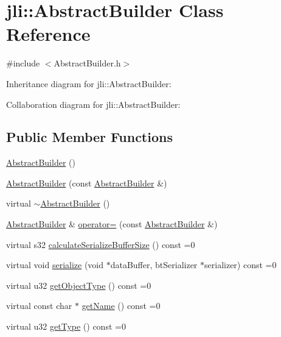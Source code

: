 \hypertarget{classjli_1_1_abstract_builder}{\section{jli\+:\+:Abstract\+Builder Class Reference}
\label{classjli_1_1_abstract_builder}
}


{\ttfamily \#include $<$Abstract\+Builder.\+h$>$}



Inheritance diagram for jli\+:\+:Abstract\+Builder\+:


Collaboration diagram for jli\+:\+:Abstract\+Builder\+:
\subsection*{Public Member Functions}
\begin{DoxyCompactItemize}
\item 
\hyperlink{classjli_1_1_abstract_builder_a25c37208a1124c8d16688ed9627b91ac}{Abstract\+Builder} ()
\item 
\hyperlink{classjli_1_1_abstract_builder_afa72506ca991fd169f99aca02cf0a56e}{Abstract\+Builder} (const \hyperlink{classjli_1_1_abstract_builder}{Abstract\+Builder} \&)
\item 
virtual \hyperlink{classjli_1_1_abstract_builder_ac685e3eedc598acfa1f8f879e8bd8767}{$\sim$\+Abstract\+Builder} ()
\item 
\hyperlink{classjli_1_1_abstract_builder}{Abstract\+Builder} \& \hyperlink{classjli_1_1_abstract_builder_af22cd8c52e03a1ce5adad70b6b9c06cf}{operator=} (const \hyperlink{classjli_1_1_abstract_builder}{Abstract\+Builder} \&)
\item 
virtual s32 \hyperlink{classjli_1_1_abstract_builder_a107ab66007cc293eb54c74e466c5d30a}{calculate\+Serialize\+Buffer\+Size} () const =0
\item 
virtual void \hyperlink{classjli_1_1_abstract_builder_a03c8719c6b852d1a21b1c7e0b7469fc0}{serialize} (void $\ast$data\+Buffer, bt\+Serializer $\ast$serializer) const =0
\item 
virtual u32 \hyperlink{classjli_1_1_abstract_builder_ab4bc84bbd7ff6f7b14b319a9dac4f67f}{get\+Object\+Type} () const =0
\item 
virtual const char $\ast$ \hyperlink{classjli_1_1_abstract_builder_a390358e86d1f93a41660bd40ec6e69dc}{get\+Name} () const =0
\item 
virtual u32 \hyperlink{classjli_1_1_abstract_builder_a826f70c995257424b7d81ab2d4706ccf}{get\+Type} () const =0
\end{DoxyCompactItemize}
